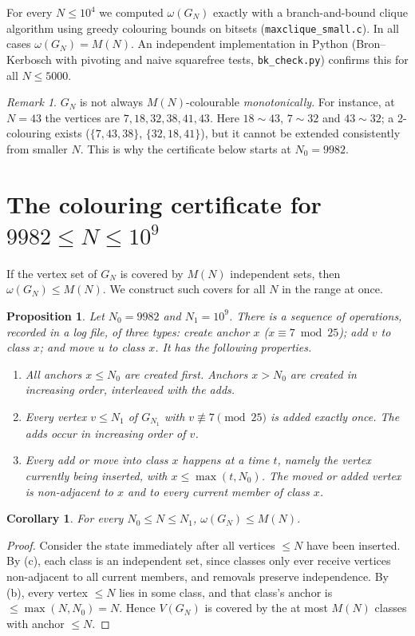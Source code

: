 \documentclass[11pt]{amsart}
\newtheorem{proposition}[theorem]{Proposition}
\newtheorem{corollary}[theorem]{Corollary}
\theoremstyle{definition}
\theoremstyle{remark}
\newtheorem{remark}[theorem]{Remark}
\begin{document}
For every $N\le10^4$ we computed $\omega(G_N)$ exactly with a branch-and-bound clique algorithm using greedy
colouring bounds on bitsets (\texttt{maxclique\_small.c}). In all cases $\omega(G_N)=M(N)$. An independent
implementation in Python (Bron--Kerbosch with pivoting and naive squarefree tests, \texttt{bk\_check.py})
confirms this for all $N\le5000$.

\begin{remark}
$G_N$ is not always $M(N)$-colourable \emph{monotonically}. For instance, at $N=43$ the vertices are
$7,18,32,38,41,43$. Here $18\sim43$, $7\sim32$ and $43\sim32$; a 2-colouring exists ($\{7,43,38\}$,
$\{32,18,41\}$), but it cannot be extended consistently from smaller $N$. This is why the certificate below
starts at $N_0=9982$.
\end{remark}

\section{The colouring certificate for \texorpdfstring{$9982\le N\le10^9$}{9982 <= N <= 10^9}}\label{sec:cert}

If the vertex set of $G_N$ is covered by $M(N)$ independent sets, then $\omega(G_N)\le M(N)$. We construct such
covers for all $N$ in the range at once.

\begin{proposition}\label{prop:cert}
Let $N_0=9982$ and $N_1=10^9$. There is a sequence of operations, recorded in a log file, of three types:
\emph{create anchor $x$} ($x\equiv7\bmod25$); \emph{add $v$ to class $x$}; and \emph{move $u$ to class $x$}.
It has the following properties.
\begin{enumerate}[label=(\alph*)]
\item All anchors $x\le N_0$ are created first. Anchors $x>N_0$ are created in increasing order, interleaved
  with the adds.
\item Every vertex $v\le N_1$ of $G_{N_1}$ with $v\not\equiv7\pmod{25}$ is added exactly once. The adds occur
  in increasing order of $v$.
\item Every add or move into class $x$ happens at a time $t$, namely the vertex currently being inserted, with
  $x\le\max(t,N_0)$. The moved or added vertex is non-adjacent to $x$ and to every current member of
  class $x$.
\end{enumerate}
\end{proposition}

\begin{corollary}
For every $N_0\le N\le N_1$, $\omega(G_N)\le M(N)$.
\end{corollary}
\begin{proof}
Consider the state immediately after all vertices $\le N$ have been inserted. By (c), each class is an
independent set, since classes only ever receive vertices non-adjacent to all current members, and removals
preserve independence. By (b), every vertex $\le N$ lies in some class, and that class's anchor is
$\le\max(N,N_0)=N$. Hence $V(G_N)$ is covered by the at most $M(N)$ classes with anchor $\le N$.
\end{proof}
\end{document}
